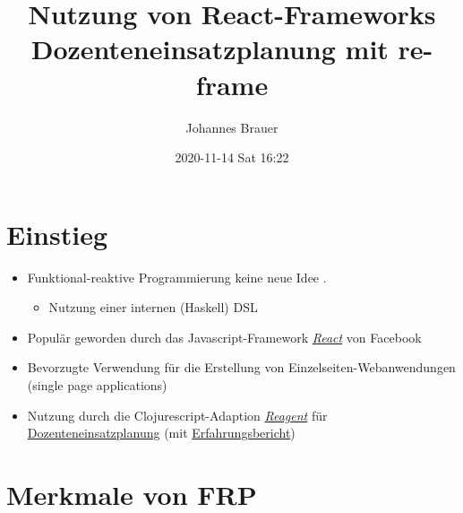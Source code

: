\documentclass[a4paper]{article}
\author{Johannes Brauer}
\date{2020-11-14 Sat 16:22}
\title{Nutzung von React-Frameworks\\\medskip
\large Dozenteneinsatzplanung mit re-frame}
\begin{document}
\maketitle

\section*{Einstieg}
\label{sec:org469c1ce}
\begin{itemize}
\item Funktional-reaktive Programmierung keine neue Idee
\cite{Wan2000Functional}.
\begin{itemize}
\item Nutzung einer internen (Haskell) DSL
\end{itemize}
\item Populär geworden durch das Javascript-Framework \emph{\href{https://reactjs.org}{React}} von Facebook
\item Bevorzugte Verwendung für die Erstellung von Einzelseiten-Webanwendungen (single
page applications)
\item Nutzung durch die Clojurescript-Adaption \emph{\href{https://github.com/reagent-project/reagent}{Reagent}} für
\href{https://johbra.github.io/dep/}{Dozenteneinsatzplanung} (mit \href{https://drive.google.com/open?id=1ZR3xy5EXyZfarY7tpM-t8LH1V5gfLO3F}{Erfahrungsbericht})
\end{itemize}
\section*{Merkmale von FRP}
\label{sec:org2f355a1}
\end{document}
